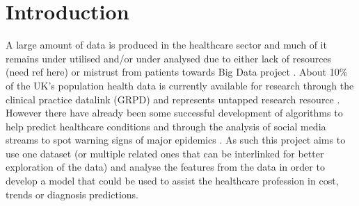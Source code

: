 \chapter{Introduction}
 \setcounter{page}{1}

A large amount of data is produced in the healthcare sector \cite{EMC:2014ve} and much of it remains under utilised and/or under analysed due to either lack of resources (need ref here) or mistrust from patients towards Big Data project \cite{Goldacre:tf}\cite{bcs:2017tl}. About 10\% of the UK's population health data is currently available for research through the clinical practice datalink (GRPD) and represents untapped research resource \cite{Kousoulis:2015ti}. However there have already been some successful development of algorithms to help predict healthcare conditions \cite{Bellon:2013um} and through the analysis of social media streams to spot warning signs of major epidemics \cite{Kostkova:2016ur}.
As such this project aims to use one dataset (or multiple related ones that can be interlinked for better exploration of the data) and analyse the features from the data in order to develop a model that could be used to assist the healthcare profession in cost, trends or diagnosis predictions.


